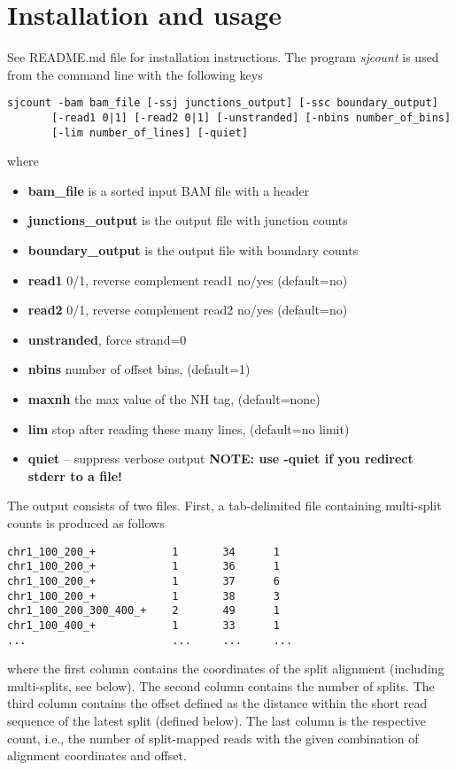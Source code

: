 \documentclass{article}
\begin{document}
\section{Installation and usage}
See README.md file for installation instructions. The program {\em sjcount} is used from the command line with the following keys
\begin{verbatim}
sjcount -bam bam_file [-ssj junctions_output] [-ssc boundary_output]
       [-read1 0|1] [-read2 0|1] [-unstranded] [-nbins number_of_bins]
       [-lim number_of_lines] [-quiet]
\end{verbatim}
where
\begin{itemize}
\item {\bf bam\_file} is a sorted input BAM file with a header
\item {\bf junctions\_output} is the output file with junction counts
\item {\bf boundary\_output} is the output file with boundary counts
\item {\bf read1} 0/1, reverse complement read1 no/yes (default=no)
\item {\bf read2} 0/1, reverse complement read2 no/yes (default=no)
\item {\bf unstranded}, force strand=0
\item {\bf nbins} number of offset bins, (default=1)
\item {\bf maxnh} the max value of the NH tag, (default=none)
\item {\bf lim} stop after reading these many lines, (default=no limit)
\item {\bf quiet} -- suppress verbose output {\bf NOTE: use -quiet if you redirect stderr to a file!}
\end{itemize}

The output consists of two files. First, a tab-delimited file containing multi-split counts is produced as follows
\begin{verbatim}
chr1_100_200_+            1       34      1
chr1_100_200_+            1       36      1
chr1_100_200_+            1       37      6
chr1_100_200_+            1       38      3
chr1_100_200_300_400_+    2       49      1
chr1_100_400_+            1       33      1
...                       ...     ...     ...
\end{verbatim}
where the first column contains the coordinates of the split alignment (including multi-splits, see below). The second 
column contains the number of splits. The third column contains the offset defined as the distance within the short read 
sequence of the latest split (defined below). The last column is the respective count, i.e., the number of split-mapped 
reads with the given combination of alignment coordinates and offset. 
\end{document}

